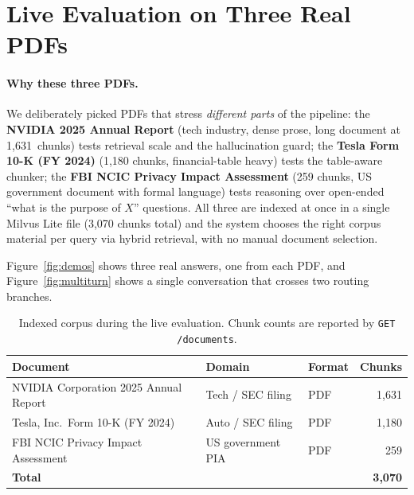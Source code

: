 \documentclass[11pt,a4paper]{article}
\begin{document}
\section{Live Evaluation on Three Real PDFs}
\label{sec:eval}

\paragraph{Why these three PDFs.}
We deliberately picked PDFs that stress \emph{different parts} of the
pipeline: the \textbf{NVIDIA 2025 Annual Report} (tech industry, dense
prose, long document at 1{,}631~chunks) tests retrieval scale and the
hallucination guard; the \textbf{Tesla Form 10-K (FY 2024)} (1{,}180
chunks, financial-table heavy) tests the table-aware chunker; the
\textbf{FBI NCIC Privacy Impact Assessment} (259 chunks, US government
document with formal language) tests reasoning over open-ended
``what is the purpose of $X$'' questions. All three are indexed at once
in a single Milvus Lite file (3{,}070 chunks total) and the system
chooses the right corpus material per query via hybrid retrieval, with no
manual document selection.

Figure~\ref{fig:demos} shows three real answers, one from each PDF, and
Figure~\ref{fig:multiturn} shows a single conversation that crosses two
routing branches.

\begin{table}[h]
\centering
\small
\caption{Indexed corpus during the live evaluation. Chunk counts are
reported by \texttt{GET /documents}.}
\label{tab:corpus}
\begin{tabularx}{0.85\linewidth}{@{}Xllr@{}}
\toprule
Document & Domain & Format & Chunks \\
\midrule
NVIDIA Corporation 2025 Annual Report     & Tech / SEC filing  & PDF  & 1{,}631 \\
Tesla, Inc.\ Form 10-K (FY 2024)          & Auto / SEC filing  & PDF  & 1{,}180 \\
FBI NCIC Privacy Impact Assessment        & US government PIA  & PDF  & 259 \\
\midrule
\textbf{Total}                            &                    &      & \textbf{3{,}070} \\
\bottomrule
\end{tabularx}
\end{table}
\end{document}
